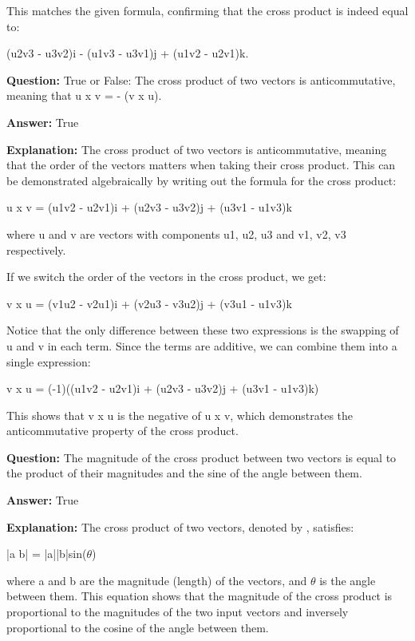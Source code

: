 \documentclass{article}
\begin{document}
This matches the given formula, confirming that the cross product is indeed equal to:

(u2v3 - u3v2)i - (u1v3 - u3v1)j + (u1v2 - u2v1)k.
                
                \vspace{0.5cm} 
        
            
                \textbf {Question:} True or False: The cross product of two vectors is anticommutative, meaning that u x v = - (v x u).
                
                \textbf{Answer:} True

                \textbf{Explanation:} The cross product of two vectors is anticommutative, meaning that the order of the vectors matters when taking their cross product. This can be demonstrated algebraically by writing out the formula for the cross product:

u x v = (u1v2 - u2v1)i + (u2v3 - u3v2)j + (u3v1 - u1v3)k

where u and v are vectors with components u1, u2, u3 and v1, v2, v3 respectively.

If we switch the order of the vectors in the cross product, we get:

v x u = (v1u2 - v2u1)i + (v2u3 - v3u2)j + (v3u1 - u1v3)k

Notice that the only difference between these two expressions is the swapping of u and v in each term. Since the terms are additive, we can combine them into a single expression:

v x u = (-1)((u1v2 - u2v1)i + (u2v3 - u3v2)j + (u3v1 - u1v3)k)

This shows that v x u is the negative of u x v, which demonstrates the anticommutative property of the cross product.
                
                \vspace{0.5cm} 
        
            
                \textbf {Question:} The magnitude of the cross product between two vectors is equal to the product of their magnitudes and the sine of the angle between them.
                
                \textbf{Answer:} True

                \textbf{Explanation:} The cross product of two vectors, denoted by {\texttimes}, satisfies:

|a {\texttimes} b| = |a||b|sin(\ensuremath{\theta})

where a and b are the magnitude (length) of the vectors, and \ensuremath{\theta} is the angle between them. This equation shows that the magnitude of the cross product is proportional to the magnitudes of the two input vectors and inversely proportional to the cosine of the angle between them.
\end{document}

